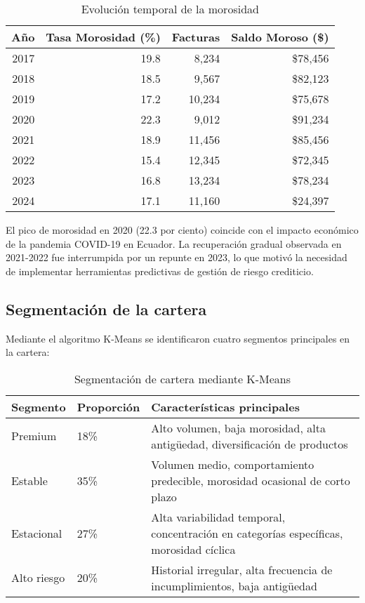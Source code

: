 \begin{table}[ht]
\centering
\begin{tabular}{|r|r|r|r|}
\hline
\textbf{Año} & \textbf{Tasa Morosidad (\%)} & \textbf{Facturas} & \textbf{Saldo Moroso (\$)} \\
\hline
2017 & 19.8 & 8,234 & \$78,456 \\
2018 & 18.5 & 9,567 & \$82,123 \\
2019 & 17.2 & 10,234 & \$75,678 \\
2020 & 22.3 & 9,012 & \$91,234 \\
2021 & 18.9 & 11,456 & \$85,456 \\
2022 & 15.4 & 12,345 & \$72,345 \\
2023 & 16.8 & 13,234 & \$78,234 \\
2024 & 17.1 & 11,160 & \$24,397 \\
\hline
\end{tabular}
\caption{Evolución temporal de la morosidad}
\end{table}

El pico de morosidad en 2020 (22.3 por ciento) coincide con el impacto económico de la pandemia COVID-19 en Ecuador. La recuperación gradual observada en 2021-2022 fue interrumpida por un repunte en 2023, lo que motivó la necesidad de implementar herramientas predictivas de gestión de riesgo crediticio.
\subsection{Segmentación de la cartera}
Mediante el algoritmo K-Means se identificaron cuatro segmentos principales en la cartera:

\begin{table}[ht]
\centering
\begin{tabular}{|p{2.5cm}|p{2.5cm}|p{9cm}|}
\hline
\textbf{Segmento} & \textbf{Proporción} & \textbf{Características principales} \\
\hline
Premium & 18\% & Alto volumen, baja morosidad, alta antigüedad, diversificación de productos \\
\hline
Estable & 35\% & Volumen medio, comportamiento predecible, morosidad ocasional de corto plazo \\
\hline
Estacional & 27\% & Alta variabilidad temporal, concentración en categorías específicas, morosidad cíclica \\
\hline
Alto riesgo & 20\% & Historial irregular, alta frecuencia de incumplimientos, baja antigüedad \\
\hline
\end{tabular}
\caption{Segmentación de cartera mediante K-Means}
\end{table}

